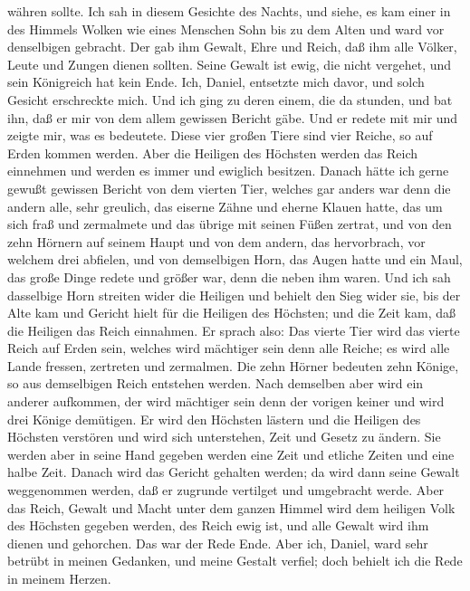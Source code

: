 währen sollte.  Ich sah in diesem Gesichte des Nachts, und
siehe, es kam einer in des Himmels Wolken wie eines Menschen Sohn bis zu
dem Alten und ward vor denselbigen gebracht.  Der gab ihm
Gewalt, Ehre und Reich, daß ihm alle Völker, Leute und Zungen dienen
sollten. Seine Gewalt ist ewig, die nicht vergehet, und sein Königreich
hat kein Ende.  Ich, Daniel, entsetzte mich davor, und
solch Gesicht erschreckte mich.  Und ich ging zu deren
einem, die da stunden, und bat ihn, daß er mir von dem allem gewissen
Bericht gäbe. Und er redete mit mir und zeigte mir, was es bedeutete.
 Diese vier großen Tiere sind vier Reiche, so auf Erden
kommen werden.  Aber die Heiligen des Höchsten werden das
Reich einnehmen und werden es immer und ewiglich besitzen. 
Danach hätte ich gerne gewußt gewissen Bericht von dem vierten Tier,
welches gar anders war denn die andern alle, sehr greulich, das eiserne
Zähne und eherne Klauen hatte, das um sich fraß und zermalmete und das
übrige mit seinen Füßen zertrat,  und von den zehn Hörnern
auf seinem Haupt und von dem andern, das hervorbrach, vor welchem drei
abfielen, und von demselbigen Horn, das Augen hatte und ein Maul, das
große Dinge redete und größer war, denn die neben ihm waren.
 Und ich sah dasselbige Horn streiten wider die Heiligen
und behielt den Sieg wider sie,  bis der Alte kam und
Gericht hielt für die Heiligen des Höchsten; und die Zeit kam, daß die
Heiligen das Reich einnahmen.  Er sprach also: Das vierte
Tier wird das vierte Reich auf Erden sein, welches wird mächtiger sein
denn alle Reiche; es wird alle Lande fressen, zertreten und zermalmen.
 Die zehn Hörner bedeuten zehn Könige, so aus demselbigen
Reich entstehen werden. Nach demselben aber wird ein anderer aufkommen,
der wird mächtiger sein denn der vorigen keiner und wird drei Könige
demütigen.  Er wird den Höchsten lästern und die Heiligen
des Höchsten verstören und wird sich unterstehen, Zeit und Gesetz zu
ändern. Sie werden aber in seine Hand gegeben werden eine Zeit und
etliche Zeiten und eine halbe Zeit.  Danach wird das
Gericht gehalten werden; da wird dann seine Gewalt weggenommen werden,
daß er zugrunde vertilget und umgebracht werde.  Aber das
Reich, Gewalt und Macht unter dem ganzen Himmel wird dem heiligen Volk
des Höchsten gegeben werden, des Reich ewig ist, und alle Gewalt wird
ihm dienen und gehorchen.  Das war der Rede Ende. Aber ich,
Daniel, ward sehr betrübt in meinen Gedanken, und meine Gestalt verfiel;
doch behielt ich die Rede in meinem Herzen.

